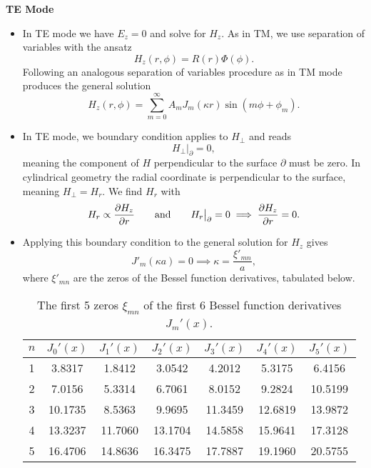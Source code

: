 \documentclass[11pt, a4paper]{article}
\newcommand{\eqtext}[1]{\qquad \text{#1} \qquad}
\begin{document}
\textbf{TE Mode}
\begin{itemize}
    \item In TE mode we have $ E_{z} = 0 $ and solve for $ H_{z} $. As in TM, we use separation of variables with the ansatz
	\begin{equation*}
		H_{z}(r, \phi) = R(r)\Phi(\phi).
	\end{equation*}
	Following an analogous separation of variables procedure as in TM mode produces the general solution
	\begin{equation*}
		H_{z}(r, \phi) = \sum_{m = 0}^{\infty} A_{m}J_{m}(\kappa r)\sin(m\phi + \phi_{m}).
	\end{equation*}
	
	\item In TE mode, we boundary condition applies to $ H_{\perp} $ and reads 
	\begin{equation*}
		H_{\perp}\big |_{\partial} = 0,
	\end{equation*}
	meaning the component of $ H $ perpendicular to the surface $ \partial $ must be zero. In cylindrical geometry the radial coordinate is perpendicular to the surface, meaning $ H_{\perp} = H_{r}$. We find $ H_{r} $ with
	\begin{equation*}
        H_{r} \propto \pdv{H_{z}}{r} \eqtext{and} H_{r}\big |_{\partial} = 0 \implies \pdv{H_{z}}{r} (a, \phi) = 0.
	\end{equation*}
	
	\item Applying this boundary condition to the general solution for $ H_{z} $ gives
	\begin{equation*}
		J'_{m}(\kappa a) = 0 \implies \kappa = \frac{\xi'_{mn}}{a},
	\end{equation*}
	where $ \xi'_{mn} $ are the zeros of the Bessel function derivatives, tabulated below.
	
\begin{table}[htb!]
    \centering
    \begin{tabular}{c|c|c|c|c|c|c}
        $ n $ & $ J_{0}' (x) $ & $ J_{1}'(x) $ & $ J_{2}'(x) $ & $ J_{3}'(x) $ & $ J_{4}'(x) $ & $ J_{5}'(x) $  \\
       \hline
       1 & 3.8317 & 1.8412 & 3.0542 & 4.2012 & 5.3175 & 6.4156\\
       2 & 7.0156 & 5.3314 & 6.7061 & 8.0152 & 9.2824 & 10.5199\\
       3 & 10.1735 & 8.5363 & 9.9695 & 11.3459 & 12.6819 & 13.9872\\
       4 & 13.3237 & 11.7060 & 13.1704 & 14.5858 & 15.9641 & 17.3128\\
       5 & 16.4706 & 14.8636 & 16.3475 & 17.7887 & 19.1960 & 20.5755 \\
    \end{tabular}
    \caption{The first 5 zeros $ \xi_{mn} $ of the first 6 Bessel function derivatives $ J_{m}'(x) $.}
\end{table}
    

\end{itemize}
\end{document}
